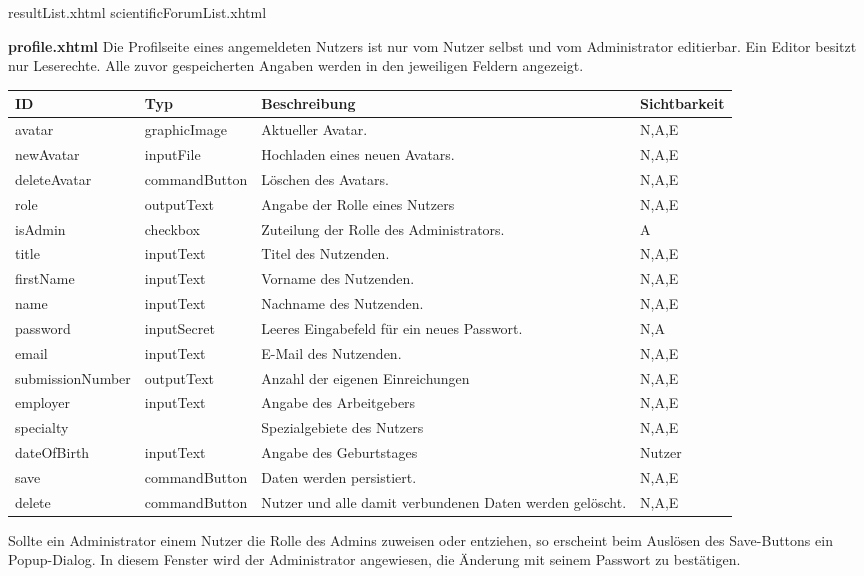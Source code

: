resultList.xhtml
scientificForumList.xhtml

\textbf{profile.xhtml} Die Profilseite eines angemeldeten Nutzers ist nur vom Nutzer selbst und vom Administrator editierbar.
Ein Editor besitzt nur Leserechte. Alle zuvor gespeicherten Angaben werden in den jeweiligen Feldern angezeigt.

\begin{tabular}[H]{|m{2cm}|m{3cm}|m{6cm}|m{2.5cm}|}
    \hline
    \textbf{ID} & \textbf{Typ} & \textbf{Beschreibung} & \textbf{Sichtbarkeit} \\
    \hline
    \hline
    avatar & graphicImage & Aktueller Avatar. & N,A,E\\
    \hline
    newAvatar & inputFile & Hochladen eines neuen Avatars. & N,A,E\\
    \hline
    deleteAvatar & commandButton & Löschen des Avatars. & N,A,E\\
    \hline
    role & outputText & Angabe der Rolle eines Nutzers & N,A,E\\
    \hline
    isAdmin & checkbox & Zuteilung der Rolle des Administrators. & A\\
    \hline
    title & inputText & Titel des Nutzenden. & N,A,E\\
    \hline
    firstName & inputText & Vorname des Nutzenden. & N,A,E\\
    \hline
    name & inputText & Nachname des Nutzenden. & N,A,E\\
    \hline
    password & inputSecret & Leeres Eingabefeld für ein neues Passwort. & N,A\\
    \hline
    email & inputText & E-Mail des Nutzenden. & N,A,E\\
    \hline
    submissionNumber & outputText & Anzahl der eigenen Einreichungen & N,A,E\\
    \hline
    employer & inputText & Angabe des Arbeitgebers & N,A,E\\
    \hline
    specialty & & Spezialgebiete des Nutzers & N,A,E \\
    \hline
    dateOfBirth & inputText & Angabe des Geburtstages & Nutzer\\
    \hline
    save & commandButton & Daten werden persistiert. & N,A,E\\
    \hline
    delete & commandButton & Nutzer und alle damit verbundenen Daten werden gelöscht. & N,A,E\\
    \hline
\end{tabular}

Sollte ein Administrator einem Nutzer die Rolle des Admins zuweisen oder entziehen, so erscheint beim Auslösen des Save-Buttons ein Popup-Dialog.
In diesem Fenster wird der Administrator angewiesen, die Änderung mit seinem Passwort zu bestätigen.

